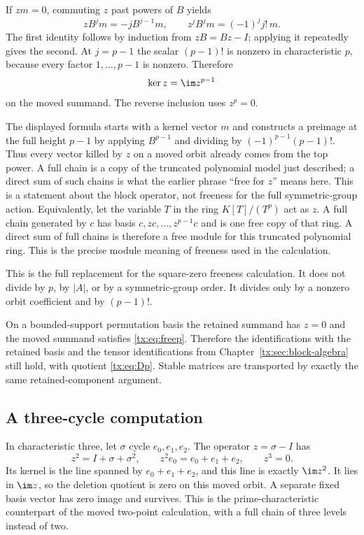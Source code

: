 \documentclass[11pt,a4paper,oneside,openany]{book}
\theoremstyle{definition}\newtheorem{definition}[theorem]{Definition}
\theoremstyle{remark}\newtheorem{remark}[theorem]{Remark}
\numberwithin{equation}{chapter}
\begin{document}
If $zm=0$, commuting $z$ past powers of $B$ yields
\[zB^jm=-jB^{j-1}m,
\qquad z^jB^jm=(-1)^jj!\,m.
\]
The first identity follows by induction from $zB=Bz-I$; applying it repeatedly gives the second. At $j=p-1$ the scalar $(p-1)!$ is nonzero in characteristic $p$, because every factor $1,\ldots,p-1$ is nonzero. Therefore
\begin{equation}\label{tx:eq:freep}\ker z=\im z^{p-1}
\end{equation}
on the moved summand. The reverse inclusion uses $z^p=0$.

The displayed formula starts with a kernel vector $m$ and constructs
a preimage at the full height $p-1$ by applying $B^{p-1}$ and dividing
by $(-1)^{p-1}(p-1)!$. Thus every vector killed by $z$ on a moved
orbit already comes from the top power. A full chain is a copy of
the truncated polynomial model just described; a direct sum of such
chains is what the earlier phrase ``free for $z$'' means here.
This is a statement about the block operator, not freeness for the
full symmetric-group action.
Equivalently, let the variable $T$ in the ring $K[T]/(T^p)$ act
as $z$. A full chain generated by $c$ has basis
$c,zc,\ldots,z^{p-1}c$ and is one free copy of that ring.
A direct sum of full chains is therefore a free module for this
truncated polynomial ring. This is the precise module meaning of
freeness used in the calculation.

This is the full replacement for the square-zero freeness calculation. It does not divide by $p$, by $|A|$, or by a symmetric-group order. It divides only by a nonzero orbit coefficient and by $(p-1)!$.

On a bounded-support permutation basis the retained summand has $z=0$ and the moved summand satisfies \eqref{tx:eq:freep}. Therefore the identifications with the retained basis and the tensor identifications from Chapter~\ref{tx:sec:block-algebra} still hold, with quotient \eqref{tx:eq:Dp}. Stable matrices are transported by exactly the same retained-component argument.

\subsection{A three-cycle computation}
In characteristic three, let $\sigma$ cycle $e_0,e_1,e_2$.
The operator $z=\sigma-I$ has
\[
 z^2=I+\sigma+\sigma^2,\qquad
 z^2 e_0=e_0+e_1+e_2,\qquad z^3=0.
\]
Its kernel is the line spanned by $e_0+e_1+e_2$, and this line is
exactly $\im z^2$. It lies in $\im z$, so the deletion quotient
is zero on this moved orbit. A separate fixed basis vector has
zero image and survives. This is the prime-characteristic counterpart
of the moved two-point calculation, with a full chain of three
levels instead of two.
\end{document}
